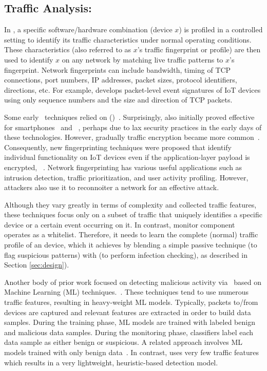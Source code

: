 \subsection{Traffic Analysis: \ta}\label{subsec:network-monitoring}
% 
In \ta, a specific software/hardware combination (device $x$) is profiled in a controlled setting to identify its traffic characteristics under normal operating conditions. These characteristics (also referred to as $x$'s traffic fingerprint or profile) are then used to identify $x$ on any network by matching live traffic patterns to $x$'s fingerprint. Network fingerprints can include bandwidth, timing of TCP connections, port numbers, IP addresses, packet sizes, protocol identifiers, directions, etc. For example, 
\cite{trimananda2020packet} develops packet-level event signatures of IoT devices using only sequence numbers and the
size and direction of TCP packets.  

Some early \ta\ techniques relied on \dpidefinition{} (\dpi{})~\cite{moore2005,ma2006}.
Surprisingly, \dpi{} also initially proved effective for smartphones~\cite{miskovic2015} and \iot{}~\cite{feng2018}, 
perhaps due to lax security practices in the early days of these technologies.
However, gradually traffic encryption became more common~\cite{razaghpanah2017,alrawi2019,huang2020}. Consequently, new fingerprinting techniques were proposed that identify individual functionality on IoT devices even
if the application-layer payload is encrypted, \eg{}~\cite{oconnor2019,trimananda2020packet,acar2020,varmarken2022fingerprintv}. 
Network fingerprinting has various useful applications such as intrusion detection, traffic prioritization, and user activity profiling. However, attackers also use it to reconnoiter a network for an effective attack.

Although they vary greatly in terms of complexity and collected traffic features, these techniques focus only on a subset 
of \iot{} traffic that uniquely identifies a specific device or a certain event occurring on it. In contrast, \system{} monitor component
operates as a whitelist. Therefore, it needs to learn the complete (normal) traffic profile of an \iot{} device, which it achieves by
blending a simple passive \ta technique (to flag suspicious patterns) with \ra (to perform infection checking), 
as described in Section \ref{sec:design}).

Another body of prior work focused on detecting malicious activity via \ta\ based on Machine Learning (ML) 
techniques.~\cite{tekiner2022lightweight,marin2019deep,nguyen2019diot,alrashdi2019ad,wozniak2020recurrent}.
These techniques tend to use numerous traffic features, resulting in heavy-weight ML models.
Typically, packets to/from \iot{} devices are captured and relevant features are extracted in order to build data samples. 
During the training phase, ML models are trained with labeled benign and malicious data samples. 
During the monitoring phase, classifiers label each data sample as either benign or suspicious. 
A related approach involves ML models trained with only benign data~\cite{meidan2018n,rey2022federated}.
In contrast, \system{} uses very few traffic features which results in a very lightweight, heuristic-based detection model.

